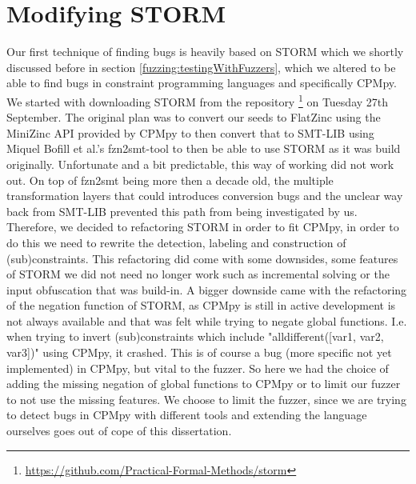 \section{Modifying STORM}
\label{impl:modifyingSTROM}
Our first technique of finding bugs is heavily based on STORM which we shortly discussed before in section \ref{fuzzing:testingWithFuzzers}, which we altered to be able to find bugs in constraint programming languages and specifically CPMpy. We started with downloading STORM from the repository \footnote{\url{https://github.com/Practical-Formal-Methods/storm}} on Tuesday 27th September.
The original plan was to convert our seeds to FlatZinc using the MiniZinc API provided by CPMpy to then convert that to SMT-LIB \cite{72bofill2010system} using Miquel Bofill et al.'s fzn2smt-tool to then be able to use STORM as it was build originally. Unfortunate and a bit predictable, this way of working did not work out. On top of fzn2smt being more then a decade old, the multiple transformation layers that could introduces conversion bugs and the unclear way back from SMT-LIB prevented this path from being investigated by us.
Therefore, we decided to refactoring STORM in order to fit CPMpy, in order to do this we need to rewrite the detection, labeling and construction of (sub)constraints. This refactoring did come with some downsides, some features of STORM we did not need no longer work such as incremental solving or the input obfuscation that was build-in. A bigger downside came with the refactoring of the negation function of STORM, as CPMpy is still in active development is not always available and that was felt while trying to negate global functions. I.e. when trying to invert (sub)constraints which include "alldifferent([var1, var2, var3])" using CPMpy, it crashed. This is of course a bug (more specific not yet implemented) in CPMpy, but vital to the fuzzer. So here we had the choice of adding the missing negation of global functions to CPMpy or to limit our fuzzer to not use the missing features. We choose to limit the fuzzer, since we are trying to detect bugs in CPMpy with different tools and extending the language ourselves goes out of cope of this dissertation. 



